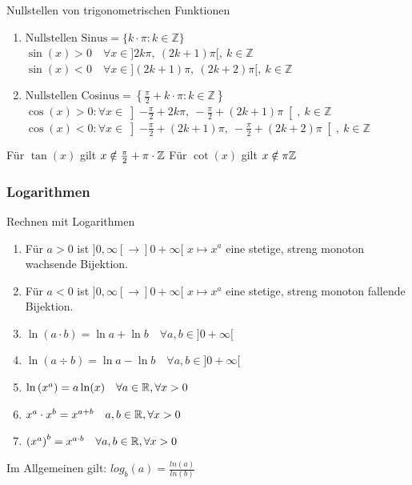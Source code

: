  \begin{corollary}{Nullstellen von trigonometrischen Funktionen}
    \begin{enumerate}
         \item $\text{Nullstellen Sinus} = \{k\cdot \pi : k\in \mathbb{Z}\}$\\
        $\sin(x) > 0 \quad \forall x \in ]2k\pi, ~(2k+1)\pi[, ~ k\in \mathbb{Z}$\\[2pt]
        $\sin(x) < 0 \quad \forall x \in ](2k + 1)\pi, ~(2k+2)\pi[, ~ k\in \mathbb{Z}$
        \item $\text{Nullstellen Cosinus} = \left\{\frac{\pi}{2}+k\cdot \pi : k\in \mathbb{Z}\right\}$\\
        $\cos(x) > 0:\forall x \in \left]-\frac{\pi}{2} +2k\pi, ~-\frac{\pi}{2} +(2k+1)\pi\right[, ~ k\in \mathbb{Z}$\\[2pt]
        $\cos(x) < 0:\forall x \in \left]-\frac{\pi}{2} + (2k + 1)\pi, ~-\frac{\pi}{2} +(2k+2)\pi\right[, ~ k\in \mathbb{Z}$
    \end{enumerate}
\end{corollary}
\noindent Für $\tan(x)$ gilt $x \notin \frac{\pi}{2} + \pi \cdot \mathbb{Z}$ \qquad Für $\cot(x)$ gilt $x \notin \pi \mathbb{Z}$
 

 \subsubsection*{Logarithmen}
 \begin{corollary}{Rechnen mit Logarithmen}
     \begin{enumerate}
         \item Für $a > 0$ ist $]0, \infty[ \to ]0 + \infty[$ \quad $x \mapsto x^a$ eine stetige, streng monoton wachsende Bijektion.
         \item Für $a < 0$ ist $]0, \infty[ \to ]0 + \infty[$ \quad $x \mapsto x^a$ eine stetige, streng monoton fallende Bijektion.
         \item $\ln (a \cdot b) = \ln a + \ln b \quad \forall a,b \in ]0 +  \infty[$
         \item $\ln (a \div b) = \ln a - \ln b \quad \forall a,b \in ]0 +  \infty[$
         \item ${\ln \left(x^a\right) = a \ln (x) \quad \forall a \in \mathbb{R}, \forall x > 0}$
         \item ${x^a \cdot x^b = x^{a+b} \quad a,b \in \mathbb{R}, \forall x > 0}$
         \item ${\left(x^a\right)^b = x^{a \cdot b} \quad \forall a,b \in \mathbb{R}, \forall x > 0}$
     \end{enumerate}
     Im Allgemeinen gilt: $log_b (a) = \frac{ln(a)}{ln(b)}$
 \end{corollary}

